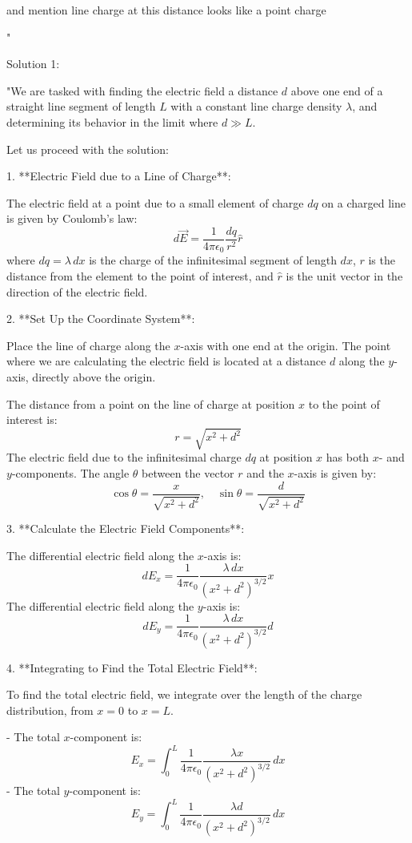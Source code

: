 and mention line charge at this distance looks like a point charge

"

Solution 1:

"We are tasked with finding the electric field a distance \( d \) above one end of a straight line segment of length \( L \) with a constant line charge density \( \lambda \), and determining its behavior in the limit where \( d \gg L \).

Let us proceed with the solution:

1. **Electric Field due to a Line of Charge**: 

The electric field at a point due to a small element of charge \( dq \) on a charged line is given by Coulomb's law:
\[
d\vec{E} = \frac{1}{4 \pi \epsilon_0} \frac{dq}{r^2} \hat{r}
\]
where \( dq = \lambda \, dx \) is the charge of the infinitesimal segment of length \( dx \), \( r \) is the distance from the element to the point of interest, and \( \hat{r} \) is the unit vector in the direction of the electric field.

2. **Set Up the Coordinate System**:

Place the line of charge along the \( x \)-axis with one end at the origin. The point where we are calculating the electric field is located at a distance \( d \) along the \( y \)-axis, directly above the origin.

The distance from a point on the line of charge at position \( x \) to the point of interest is:
\[
r = \sqrt{x^2 + d^2}
\]
The electric field due to the infinitesimal charge \( dq \) at position \( x \) has both \( x \)- and \( y \)-components. The angle \( \theta \) between the vector \( r \) and the \( x \)-axis is given by:
\[
\cos \theta = \frac{x}{\sqrt{x^2 + d^2}}, \quad \sin \theta = \frac{d}{\sqrt{x^2 + d^2}}
\]

3. **Calculate the Electric Field Components**:

The differential electric field along the \( x \)-axis is:
\[
dE_x = \frac{1}{4 \pi \epsilon_0} \frac{\lambda \, dx}{(x^2 + d^2)^{3/2}} x
\]
The differential electric field along the \( y \)-axis is:
\[
dE_y = \frac{1}{4 \pi \epsilon_0} \frac{\lambda \, dx}{(x^2 + d^2)^{3/2}} d
\]

4. **Integrating to Find the Total Electric Field**:

To find the total electric field, we integrate over the length of the charge distribution, from \( x = 0 \) to \( x = L \).

- The total \( x \)-component is:
\[
E_x = \int_0^L \frac{1}{4 \pi \epsilon_0} \frac{\lambda x}{(x^2 + d^2)^{3/2}} \, dx
\]
- The total \( y \)-component is:
\[
E_y = \int_0^L \frac{1}{4 \pi \epsilon_0} \frac{\lambda d}{(x^2 + d^2)^{3/2}} \, dx
\]

